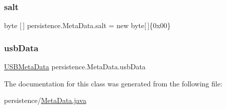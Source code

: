 \subsubsection{\texorpdfstring{salt}{salt}}
{\footnotesize\ttfamily byte \mbox{[}$\,$\mbox{]} persistence.\+Meta\+Data.\+salt = new byte\mbox{[}$\,$\mbox{]}\{0x00\}\hspace{0.3cm}{\ttfamily [private]}}

\mbox{\label{classpersistence_1_1_meta_data_a703608d838972ff752e7e78f8cb0cbe2}} 
\subsubsection{\texorpdfstring{usb\+Data}{usbData}}
{\footnotesize\ttfamily \mbox{\hyperlink{classpersistence_1_1_u_s_b_meta_data}{U\+S\+B\+Meta\+Data}} persistence.\+Meta\+Data.\+usb\+Data\hspace{0.3cm}{\ttfamily [private]}}



The documentation for this class was generated from the following file\+:\begin{DoxyCompactItemize}
\item 
persistence/\mbox{\hyperlink{_meta_data_8java}{Meta\+Data.\+java}}\end{DoxyCompactItemize}
